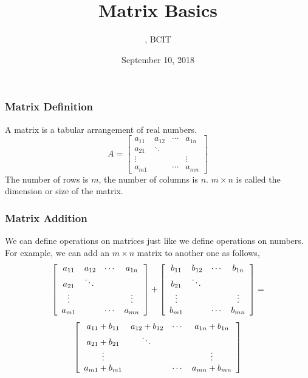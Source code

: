 \documentclass[xcolor=dvipsnames]{beamer}
\title{Matrix Basics}
\subtitle{{\CourseNumber}, BCIT}
\author{\CourseName}
\date{September 10, 2018}
\begin{document}
\begin{frame}
  \titlepage
\end{frame}

\begin{frame}
  \frametitle{Matrix Definition}
  A \alert{matrix} is a tabular arrangement of real numbers. 
  \begin{equation}
    \label{eq:oathaemo}
    A=\left[\begin{array}{cccc}
    a_{11}&a_{12}&\cdots{}&a_{1n} \\
          a_{21}&\ddots{}&& \\
          \vdots{}&&&\vdots \\
          a_{m1}&&\cdots{}&a_{mn}
  \end{array}\right]
\end{equation}
The number of rows is $m$, the number of columns is $n$. $m\times{}n$
is called the \alert{dimension} or \alert{size} of the matrix.
\end{frame}

\begin{frame}
  \frametitle{Matrix Addition}
We can define operations on matrices just like we define operations on
numbers. For example, we can add an $m\times{}n$ matrix to another one
as follows,
\begin{equation}
  \label{eq:ahloongi}
  \left[\begin{array}{cccc}
    a_{11}&a_{12}&\cdots{}&a_{1n} \\
          a_{21}&\ddots{}&& \\
          \vdots{}&&&\vdots \\
          a_{m1}&&\cdots{}&a_{mn}
  \end{array}\right]+\left[
\begin{array}{cccc}
    b_{11}&b_{12}&\cdots{}&b_{1n} \\
          b_{21}&\ddots{}&& \\
          \vdots{}&&&\vdots \\
          b_{m1}&&\cdots{}&b_{mn}
  \end{array}\right]=\notag
\end{equation}
\begin{equation}
  \label{eq:fohghoaw}
\left[
\begin{array}{cccc}
    a_{11}+b_{11}&a_{12}+b_{12}&\cdots{}&a_{1n}+b_{1n} \\
          a_{21}+b_{21}&\ddots{}&& \\
          \vdots{}&&&\vdots \\
          a_{m1}+b_{m1}&&\cdots{}&a_{mn}+b_{mn}
  \end{array}\right]\notag
\end{equation}
\end{frame}
\end{document}
